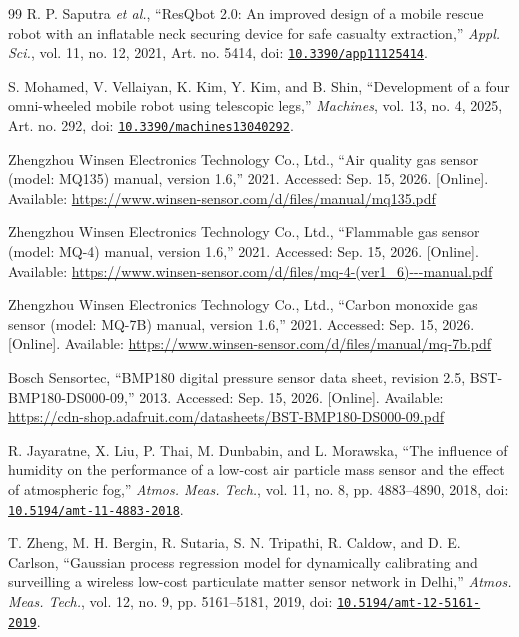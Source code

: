 \documentclass[11pt,a4paper]{article}
\begin{document}
\begin{thebibliography}{99}
R. P. Saputra \textit{et al.}, “ResQbot 2.0: An improved design of a mobile rescue robot with an inflatable neck securing device for safe casualty extraction,” \textit{Appl. Sci.}, vol. 11, no. 12, 2021, Art. no. 5414, doi: \href{https://doi.org/10.3390/app11125414}{\nolinkurl{10.3390/app11125414}}.

S. Mohamed, V. Vellaiyan, K. Kim, Y. Kim, and B. Shin, “Development of a four omni-wheeled mobile robot using telescopic legs,” \textit{Machines}, vol. 13, no. 4, 2025, Art. no. 292, doi: \href{https://doi.org/10.3390/machines13040292}{\nolinkurl{10.3390/machines13040292}}.

Zhengzhou Winsen Electronics Technology Co., Ltd., “Air quality gas sensor (model: MQ135) manual, version 1.6,” 2021. Accessed: Sep. 15, 2026. [Online]. Available: \url{https://www.winsen-sensor.com/d/files/manual/mq135.pdf}

Zhengzhou Winsen Electronics Technology Co., Ltd., “Flammable gas sensor (model: MQ-4) manual, version 1.6,” 2021. Accessed: Sep. 15, 2026. [Online]. Available: \url{https://www.winsen-sensor.com/d/files/mq-4-(ver1_6)---manual.pdf}

Zhengzhou Winsen Electronics Technology Co., Ltd., “Carbon monoxide gas sensor (model: MQ-7B) manual, version 1.6,” 2021. Accessed: Sep. 15, 2026. [Online]. Available: \url{https://www.winsen-sensor.com/d/files/manual/mq-7b.pdf}

Bosch Sensortec, “BMP180 digital pressure sensor data sheet, revision 2.5, BST-BMP180-DS000-09,” 2013. Accessed: Sep. 15, 2026. [Online]. Available: \url{https://cdn-shop.adafruit.com/datasheets/BST-BMP180-DS000-09.pdf}

R. Jayaratne, X. Liu, P. Thai, M. Dunbabin, and L. Morawska, “The influence of humidity on the performance of a low-cost air particle mass sensor and the effect of atmospheric fog,” \textit{Atmos. Meas. Tech.}, vol. 11, no. 8, pp. 4883--4890, 2018, doi: \href{https://doi.org/10.5194/amt-11-4883-2018}{\nolinkurl{10.5194/amt-11-4883-2018}}.

T. Zheng, M. H. Bergin, R. Sutaria, S. N. Tripathi, R. Caldow, and D. E. Carlson, “Gaussian process regression model for dynamically calibrating and surveilling a wireless low-cost particulate matter sensor network in Delhi,” \textit{Atmos. Meas. Tech.}, vol. 12, no. 9, pp. 5161--5181, 2019, doi: \href{https://doi.org/10.5194/amt-12-5161-2019}{\nolinkurl{10.5194/amt-12-5161-2019}}.


\end{thebibliography}
\end{document}

